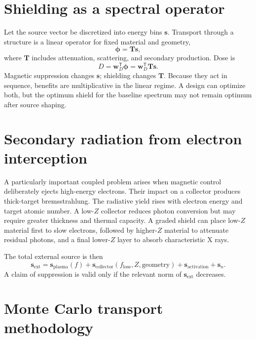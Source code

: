 \section{Shielding as a spectral operator}

Let the source vector be discretized into energy bins $\mathbf{s}$. Transport through a structure is a linear operator for fixed material and geometry,
\begin{equation}
\boldsymbol{\phi}=\mathbf{T}\mathbf{s},
\label{eq:transport-matrix}
\end{equation}
where $\mathbf{T}$ includes attenuation, scattering, and secondary production. Dose is
\begin{equation}
D=\mathbf{w}_D^{\mathsf T}\boldsymbol{\phi}
=\mathbf{w}_D^{\mathsf T}\mathbf{T}\mathbf{s}.
\label{eq:dose-matrix}
\end{equation}
Magnetic suppression changes $\mathbf{s}$; shielding changes $\mathbf{T}$. Because they act in sequence, benefits are multiplicative in the linear regime. A design can optimize both, but the optimum shield for the baseline spectrum may not remain optimum after source shaping.

\section{Secondary radiation from electron interception}

A particularly important coupled problem arises when magnetic control deliberately ejects high-energy electrons. Their impact on a collector produces thick-target bremsstrahlung. The radiative yield rises with electron energy and target atomic number. A low-$Z$ collector reduces photon conversion but may require greater thickness and thermal capacity. A graded shield can place low-$Z$ material first to slow electrons, followed by higher-$Z$ material to attenuate residual photons, and a final lower-$Z$ layer to absorb characteristic X rays.

The total external source is then
\begin{equation}
\mathbf{s}_{\mathrm{ext}}
=\mathbf{s}_{\mathrm{plasma}}(f)
+\mathbf{s}_{\mathrm{collector}}(f_{\mathrm{loss}},Z,\mathrm{geometry})
+\mathbf{s}_{\mathrm{activation}}
+\mathbf{s}_{n}.
\label{eq:total-source}
\end{equation}
A claim of suppression is valid only if the relevant norm of $\mathbf{s}_{\mathrm{ext}}$ decreases.

\section{Monte Carlo transport methodology}

